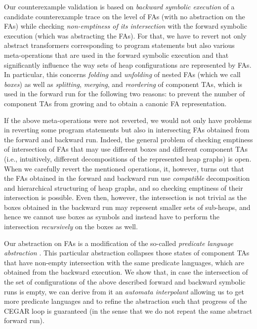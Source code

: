 {Our counterexample validation is based on \emph{backward symbolic execution} of
a candidate counterexample trace on the level of FAs (with no abstraction on the
FAs) while checking \emph{non-emptiness of its intersection} with the forward
symbolic execution (which was abstracting the FAs). For that, we have to revert
not only abstract transformers corresponding to program statements but also
various meta-operations that are used in the forward symbolic execution and that
significantly influence the way sets of heap configurations are represented by
FAs. In particular, this concerns \emph{folding} and \emph{unfolding} of nested
FAs (which we call \emph{boxes}) as well as \emph{splitting}, \emph{merging},
and \emph{reordering} of component TAs, which is used in the forward run for the
following two reasons: to
prevent the number of component TAs from growing and to obtain a canonic
FA representation. 

If the above meta-operations were not reverted, we would not only have problems
in reverting some program statements but also in intersecting FAs obtained from
the forward and backward run. Indeed, the general problem of checking emptiness
of intersection of FAs that may use different boxes and different component TAs
(i.e., intuitively, different decompositions of the represented heap graphs) is
open. When we carefully revert the mentioned operations, it, however, turns out
that the FAs obtained in the forward and backward run use \emph{compatible}
decomposition and hierarchical structuring of heap graphs, and so checking
emptiness of their intersection is possible. Even then, however, the
intersection is not trivial as the boxes obtained in the backward run may
represent smaller sets of sub-heaps, and hence we cannot use boxes as symbols
and instead have to perform the intersection \emph{recursively} on the boxes as
well.

Our abstraction on FAs is a modification of the so-called \emph{predicate
language abstraction} \cite{artmc}.
This particular abstraction collapses those states of component TAs that
have non-empty intersection with the same predicate languages, which are
obtained from the backward execution.
We show that, in
case the intersection of the set of configurations of the above described forward and backward symbolic runs
is empty, we can derive from it an \emph{automata interpolant} allowing us to
get more predicate languages and to refine the abstraction such that progress of
the CEGAR loop is guaranteed (in the sense that  we do not repeat the same
abstract forward run).

}
